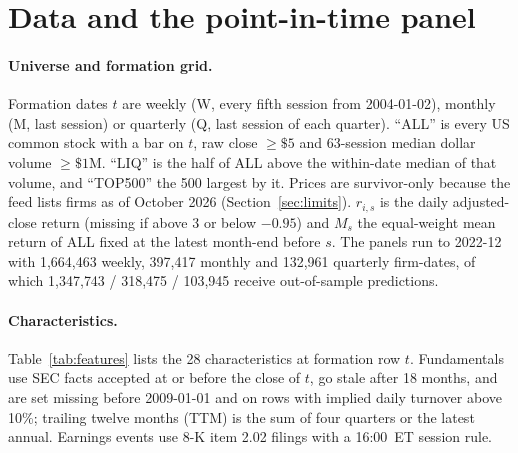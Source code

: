 \section{Data and the point-in-time panel}\label{sec:data}

\paragraph{Universe and formation grid.}
Formation dates $t$ are weekly (W, every fifth session from 2004-01-02), monthly (M, last session) or quarterly (Q, last session of each quarter). ``ALL'' is every US common stock with a bar on $t$, raw close $\ge\$5$ and 63-session median dollar volume $\ge\$1$M. ``LIQ'' is the half of ALL above the within-date median of that volume, and ``TOP500'' the 500 largest by it. Prices are survivor-only because the feed lists firms as of October 2026 (Section~\ref{sec:limits}). $r_{i,s}$ is the daily adjusted-close return (missing if above 3 or below $-0.95$) and $M_s$ the equal-weight mean return of ALL fixed at the latest month-end before $s$. The panels run to 2022-12 with 1{,}664{,}463 weekly, 397{,}417 monthly and 132{,}961 quarterly firm-dates, of which 1{,}347{,}743 / 318{,}475 / 103{,}945 receive out-of-sample predictions.

\paragraph{Characteristics.}
Table~\ref{tab:features} lists the 28 characteristics at formation row $t$. Fundamentals use SEC facts accepted at or before the close of $t$, go stale after 18 months, and are set missing before 2009-01-01 and on rows with implied daily turnover above 10\%; trailing twelve months (TTM) is the sum of four quarters or the latest annual. Earnings events use 8-K item 2.02 filings with a 16:00~ET session rule.

